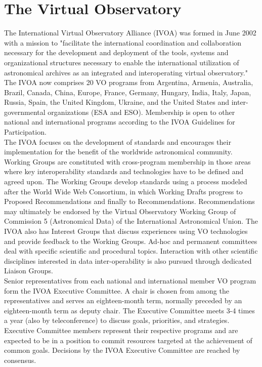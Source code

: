 
\chapter{The Virtual Observatory}

The International Virtual Observatory Alliance (IVOA) was formed in June 2002 with a mission to "facilitate the international coordination and collaboration necessary for the development and deployment of the tools, systems and organizational structures necessary to enable the international utilization of astronomical archives as an integrated and interoperating virtual observatory." The IVOA now comprises 20 VO programs from Argentina, Armenia, Australia, Brazil, Canada, China, Europe, France, Germany, Hungary, India, Italy, Japan, Russia, Spain, the United Kingdom, Ukraine, and the United States and inter-governmental organizations (ESA and ESO). Membership is open to other national and international programs according to the IVOA Guidelines for Participation.\\

The IVOA focuses on the development of standards and encourages their implementation for the benefit of the worldwide astronomical community. Working Groups are constituted with cross-program membership in those areas where key interoperability standards and technologies have to be defined and agreed upon. The Working Groups develop standards using a process modeled after the World Wide Web Consortium, in which Working Drafts progress to Proposed Recommendations and finally to Recommendations. Recommendations may ultimately be endorsed by the Virtual Observatory Working Group of Commission 5 (Astronomical Data) of the International Astronomical Union. The IVOA also has Interest Groups that discuss experiences using VO technologies and provide feedback to the Working Groups. Ad-hoc and permanent committees deal with specific scientific and procedural topics. Interaction with other scientific disciplines interested in data inter-operability is also pursued through dedicated Liaison Groups.\\

Senior representatives from each national and international member VO program form the IVOA Executive Committee. A chair is chosen from among the representatives and serves an eighteen-month term, normally preceded by an eighteen-month term as deputy chair. The Executive Committee meets 3-4 times a year (also by teleconference) to discuss goals, priorities, and strategies. Executive Committee members represent their respective programs and are expected to be in a position to commit resources targeted at the achievement of common goals. Decisions by the IVOA Executive Committee are reached by consensus.\\

